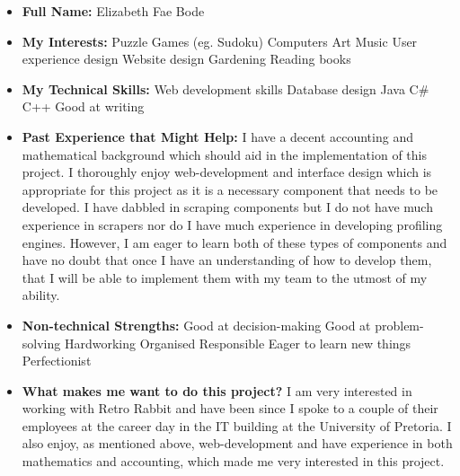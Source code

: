 \documentclass{article}
\begin{document}
	\begin{itemize}
		\item \textbf{Full Name:} Elizabeth Fae Bode
		\item \textbf{My Interests:}
		\subitem Puzzle Games (eg. Sudoku)
		\subitem Computers
		\subitem Art
		\subitem Music
		\subitem User experience design
		\subitem Website design
		\subitem Gardening
		\subitem Reading books
		
		\item \textbf{My Technical Skills:}
		\subitem Web development skills
		\subitem Database design
		\subitem Java
		\subitem C\#
		\subitem C++
		\subitem Good at writing
		
		\item \textbf{Past Experience that Might Help:} \newline
		I have a decent accounting and mathematical background which should aid in the implementation of this project. I thoroughly enjoy web-development and interface design which is appropriate for this project as it is a necessary component that needs to be developed. I have dabbled in scraping components but I do not have much experience in scrapers nor do I have much experience in developing profiling engines. However, I am eager to learn both of these types of components and have no doubt that once I have an understanding of how to develop them, that I will be able to implement them with my team to the utmost of my ability.
		
		\item \textbf{Non-technical Strengths:}
		\subitem Good at decision-making
		\subitem Good at problem-solving
		\subitem Hardworking
		\subitem Organised
		\subitem Responsible
		\subitem Eager to learn new things
		\subitem Perfectionist
		
		\item \textbf{What makes me want to do this project?} \newline
		I am very interested in working with Retro Rabbit and have been since I spoke to a couple of their employees at the career day in the IT building at the University of Pretoria. I also enjoy, as mentioned above, web-development and have experience in both mathematics and accounting, which made me very interested in this project.
	\end{itemize}
	
\end{document}
